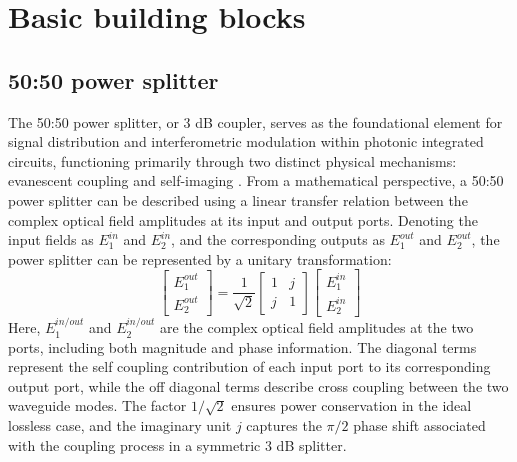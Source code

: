 \section{Basic building blocks} \label{sec:functional_blocks} %
\subsection{50:50 power splitter} \label{sub:splitter} %
The 50:50 power splitter, or 3 dB coupler, serves as the foundational element for signal distribution and interferometric modulation within photonic integrated circuits, functioning primarily through two distinct physical mechanisms: evanescent coupling \cite{ansys_evanescent_coupler} and self-imaging \cite{soldano2002optical}.
From a mathematical perspective, a 50:50 power splitter can be described using a linear transfer relation between the complex optical field amplitudes at its input and output ports.
Denoting the input fields as $E_1^{in}$ and $E_2^{in}$, and the corresponding outputs as $E_1^{out}$ and $E_2^{out}$, the power splitter can be represented by a unitary transformation:
\begin{equation}
    \begin{bmatrix}
        E_1^{out} \\
        E_2^{out}
    \end{bmatrix}
    =
    \frac{1}{\sqrt{2}}
    \begin{bmatrix}
        1 & j \\
        j & 1
    \end{bmatrix}
    \begin{bmatrix}
        E_1^{in} \\
        E_2^{in}
    \end{bmatrix}
\end{equation}
Here, $E_1^{in/out}$ and $E_2^{in/out}$ are the complex optical field amplitudes at the two ports, including both magnitude and phase information.
The diagonal terms represent the self coupling contribution of each input port to its corresponding output port, while the off diagonal terms describe cross coupling between the two waveguide modes.
The factor $1/\sqrt{2}$ ensures power conservation in the ideal lossless case, and the imaginary unit $j$ captures the $\pi/2$ phase shift associated with the coupling process in a symmetric 3 dB splitter.

